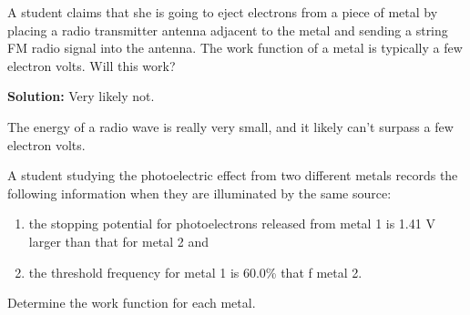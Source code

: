 \documentclass[a4paper, 12pt, addpoints]{exam}
\begin{document}
\begin{questions}

\question A student claims that she is going to eject electrons from a piece of metal by placing a radio transmitter antenna adjacent to the metal and sending a string FM radio signal into the antenna. The work function of a metal is typically a few electron volts. Will this work?

\begin{tcolorbox}
\textbf{Solution: }Very likely not.

The energy of a radio wave is really very small, and it likely can't surpass a few electron volts.
\end{tcolorbox}

\question A student studying the photoelectric effect from two different metals records the following information when they are illuminated by the same source:

\begin{enumerate}
\item the stopping potential for photoelectrons released from metal 1 is 1.41 V larger than that for metal 2 and
\item the threshold frequency for metal 1 is 60.0\% that f metal 2.
\end{enumerate}

Determine the work function for each metal.


\end{questions}
\end{document}
